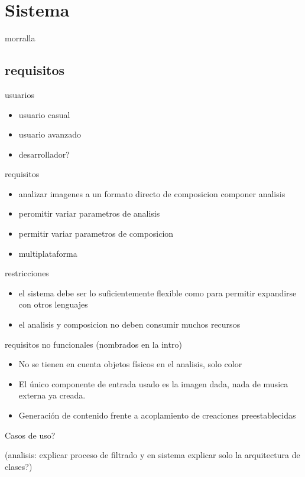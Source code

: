 \section{Sistema}

morralla


\subsection{requisitos}


	usuarios\\
	\begin{itemize}
		\item usuario casual
		\item usuario avanzado
		\item desarrollador?\\
	\end{itemize}

	requisitos\\
	\begin{itemize}
		\item analizar imagenes a un formato directo de composicion
		componer analisis
		\item peromitir variar parametros de analisis
		\item permitir variar parametros de composicion
		\item multiplataforma\\
	\end{itemize}
		
		
	restricciones\\
	\begin{itemize}
		\item el sistema debe ser lo suficientemente flexible como para permitir expandirse con otros lenguajes
		\item el analisis y composicion no deben consumir muchos recursos\\
	\end{itemize}
		
	requisitos no funcionales (nombrados en la intro)\\
	\begin{itemize}	
		\item No se tienen en cuenta objetos físicos en el analisis, solo color
		\item El único componente de entrada usado es la imagen dada, nada de musica externa ya creada.
		\item Generación de contenido frente a acoplamiento de creaciones preestablecidas	\\	
	\end{itemize}		
		
		
Casos de uso?

	(analisis: explicar proceso de filtrado y en sistema explicar solo la arquitectura de clases?)

